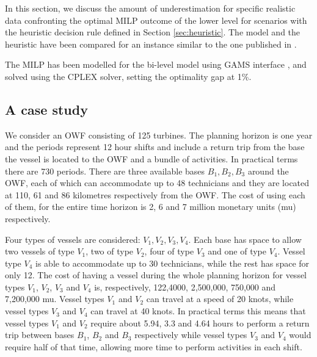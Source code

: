 In this section, we discuss the amount of underestimation for specific realistic data confronting the optimal MILP outcome of the lower level for scenarios with the heuristic decision rule defined in Section \ref{sec:heuristic}.
%
The model and the heuristic have been compared for an instance similar to the one published in \cite{ICCS2017}. 

The MILP has been modelled for the bi-level model using GAMS interface \cite{gams}, and solved using the CPLEX solver, setting the optimality gap at 1\%.

\subsection{A case study}

We consider an OWF consisting of 125 turbines. The planning horizon is one year and the periods represent 12 hour shifts and include a return trip from the base the vessel is located to the OWF and a bundle of activities. In practical terms there are 730 periods. There are three available bases $B_1,B_2,B_3$ around the OWF, each of which can accommodate up to 48 technicians and they are located at 110, 61  and 86 kilometres respectively from the OWF. The cost of using each of them, for the entire time horizon is 2, 6 and 7 million monetary units (mu) respectively.

Four types of vessels are considered: $V_1,V_2,V_3,V_4$. Each base has space to allow two vessels of type $V_1$, two of type $V_2$, four of type $V_3$ and one of type $V_4$. Vessel type $V_4$ is able to accommodate up to 30 technicians, while the rest has space for only 12. The cost of having a vessel during the whole planning horizon for vessel types $V_1$, $V_2$, $V_3$ and $V_4$ is, respectively, 122,4000, 2,500,000, 750,000 and 7,200,000 mu. Vessel types $V_1$ and $V_2$ can travel at a speed of 20 knots, while vessel types $V_3$ and $V_4$ can travel at 40 knots. In practical terms this means that vessel types $V_1$ and $V_2$ require about 5.94, 3.3 and 4.64 hours to perform a return trip between bases $B_1$, $B_2$ and $B_3$ respectively while vessel types $V_3$ and $V_4$ would require half of that time, allowing more time to perform activities in each shift.

